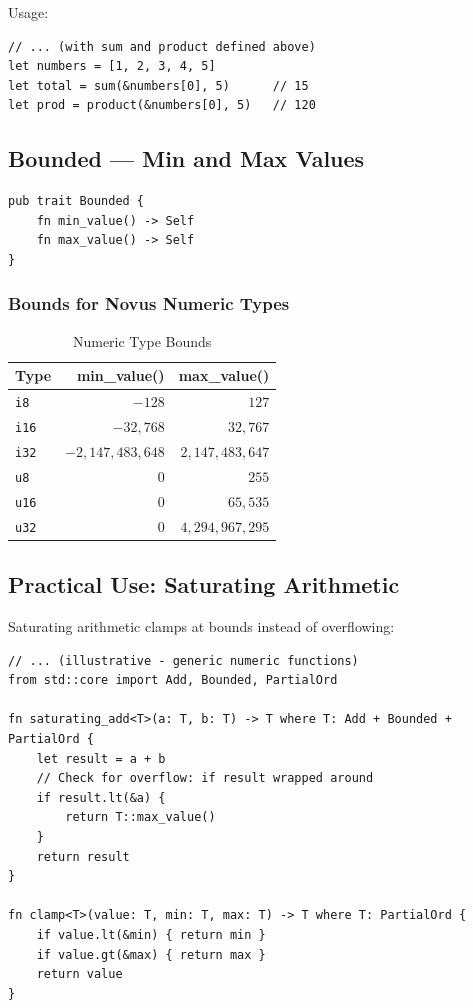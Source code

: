 Usage:

\begin{lstlisting}
// ... (with sum and product defined above)
let numbers = [1, 2, 3, 4, 5]
let total = sum(&numbers[0], 5)      // 15
let prod = product(&numbers[0], 5)   // 120
\end{lstlisting}

\subsection{Bounded --- Min and Max Values}

\begin{lstlisting}
pub trait Bounded {
    fn min_value() -> Self
    fn max_value() -> Self
}
\end{lstlisting}

\subsubsection{Bounds for Novus Numeric Types}

\begin{table}[h]
\centering
\begin{tabular}{lrr}
\hline
\textbf{Type} & \textbf{min\_value()} & \textbf{max\_value()} \\
\hline
\texttt{i8} & $-128$ & $127$ \\
\texttt{i16} & $-32{,}768$ & $32{,}767$ \\
\texttt{i32} & $-2{,}147{,}483{,}648$ & $2{,}147{,}483{,}647$ \\
\texttt{u8} & $0$ & $255$ \\
\texttt{u16} & $0$ & $65{,}535$ \\
\texttt{u32} & $0$ & $4{,}294{,}967{,}295$ \\
\hline
\end{tabular}
\caption{Numeric Type Bounds}
\end{table}

\subsection{Practical Use: Saturating Arithmetic}

Saturating arithmetic clamps at bounds instead of overflowing:

\begin{lstlisting}
// ... (illustrative - generic numeric functions)
from std::core import Add, Bounded, PartialOrd

fn saturating_add<T>(a: T, b: T) -> T where T: Add + Bounded + PartialOrd {
    let result = a + b
    // Check for overflow: if result wrapped around
    if result.lt(&a) {
        return T::max_value()
    }
    return result
}

fn clamp<T>(value: T, min: T, max: T) -> T where T: PartialOrd {
    if value.lt(&min) { return min }
    if value.gt(&max) { return max }
    return value
}
\end{lstlisting}

